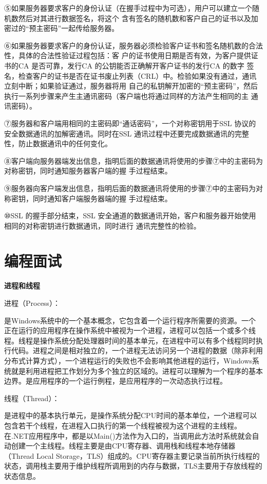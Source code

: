 \documentclass[UTF8]{ctexart}
\begin{document}
⑤如果服务器要求客户的身份认证（在握手过程中为可选），用户可以建立一个随机数然后对其进行数据签名，将这个
含有签名的随机数和客户自己的证书以及加密过的“预主密码”一起传给服务器。

⑥如果服务器要求客户的身份认证，服务器必须检验客户证书和签名随机数的合法性，具体的合法性验证过程包括：客
户的证书使用日期是否有效，为客户提供证书的CA 是否可靠，发行CA 的公钥能否正确解开客户证书的发行CA 的数字
签名，检查客户的证书是否在证书废止列表（CRL）中。检验如果没有通过，通讯立刻中断；如果验证通过，服务器将用
自己的私钥解开加密的“预主密码”，然后执行一系列步骤来产生主通讯密码（客户端也将通过同样的方法产生相同的主
通讯密码）。

⑦服务器和客户端用相同的主密码即“通话密码”，一个对称密钥用于SSL 协议的安全数据通讯的加解密通讯。同时在SSL
通讯过程中还要完成数据通讯的完整性，防止数据通讯中的任何变化。

⑧客户端向服务器端发出信息，指明后面的数据通讯将使用的步骤⑦中的主密码为对称密钥，同时通知服务器客户端的握
手过程结束。

⑨服务器向客户端发出信息，指明后面的数据通讯将使用的步骤⑦中的主密码为对称密钥，同时通知客户端服务器端的握
手过程结束。

⑩SSL 的握手部分结束，SSL 安全通道的数据通讯开始，客户和服务器开始使用相同的对称密钥进行数据通讯，同时进行
通讯完整性的检验。


\section{编程面试}

\textbf{进程和线程}

进程（Process）：

是Windows系统中的一个基本概念，它包含着一个运行程序所需要的资源。一个正在运行的应用程序在操作系统中被视为一个进程，进程可以包括一个或多个线程。线程是操作系统分配处理器时间的基本单元，在进程中可以有多个线程同时执行代码。进程之间是相对独立的，一个进程无法访问另一个进程的数据（除非利用分布式计算方式），一个进程运行的失败也不会影响其他进程的运行，Windows系统就是利用进程把工作划分为多个独立的区域的。进程可以理解为一个程序的基本边界。是应用程序的一个运行例程，是应用程序的一次动态执行过程。

线程（Thread）：

是进程中的基本执行单元，是操作系统分配CPU时间的基本单位，一个进程可以包含若干个线程，在进程入口执行的第一个线程被视为这个进程的主线程。在.NET应用程序中，都是以Main()方法作为入口的，当调用此方法时系统就会自动创建一个主线程。线程主要是由CPU寄存器、调用栈和线程本地存储器（Thread Local Storage，TLS）组成的。CPU寄存器主要记录当前所执行线程的状态，调用栈主要用于维护线程所调用到的内存与数据，TLS主要用于存放线程的状态信息。
\end{document}

